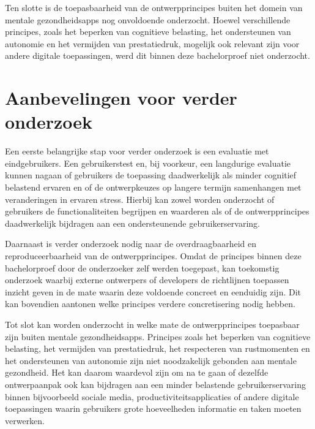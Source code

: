 \vspace{1em}

Ten slotte is de toepasbaarheid van de ontwerpprincipes buiten het domein van mentale gezondheidsapps nog onvoldoende onderzocht. Hoewel verschillende principes, zoals het beperken van cognitieve belasting, het ondersteunen van autonomie en het vermijden van prestatiedruk, mogelijk ook relevant zijn voor andere digitale toepassingen, werd dit binnen deze bachelorproef niet onderzocht.

\vspace{1em}

\section{Aanbevelingen voor verder onderzoek}
\label{sec:verder-onderzoek}

\vspace{1em}

Een eerste belangrijke stap voor verder onderzoek is een evaluatie met eindgebruikers. Een gebruikerstest en, bij voorkeur, een langdurige evaluatie kunnen nagaan of gebruikers de toepassing daadwerkelijk als minder cognitief belastend ervaren en of de ontwerpkeuzes op langere termijn samenhangen met veranderingen in ervaren stress. Hierbij kan zowel worden onderzocht of gebruikers de functionaliteiten begrijpen en waarderen als of de ontwerpprincipes daadwerkelijk bijdragen aan een ondersteunende gebruikerservaring.

\vspace{1em}

Daarnaast is verder onderzoek nodig naar de overdraagbaarheid en reproduceerbaarheid van de ontwerpprincipes. Omdat de principes binnen deze bachelorproef door de onderzoeker zelf werden toegepast, kan toekomstig onderzoek waarbij externe ontwerpers of developers de richtlijnen toepassen inzicht geven in de mate waarin deze voldoende concreet en eenduidig zijn. Dit kan bovendien aantonen welke principes verdere concretisering nodig hebben.

\vspace{1em}

Tot slot kan worden onderzocht in welke mate de ontwerpprincipes toepasbaar zijn buiten mentale gezondheidsapps. Principes zoals het beperken van cognitieve belasting, het vermijden van prestatiedruk, het respecteren van rustmomenten en het ondersteunen van autonomie zijn niet noodzakelijk gebonden aan mentale gezondheid. Het kan daarom waardevol zijn om na te gaan of dezelfde ontwerpaanpak ook kan bijdragen aan een minder belastende gebruikerservaring binnen bijvoorbeeld sociale media, productiviteitsapplicaties of andere digitale toepassingen waarin gebruikers grote hoeveelheden informatie en taken moeten verwerken.
